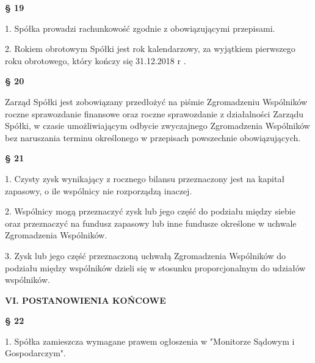 \centerline{\large\textbf{§ 19}}

1. Spółka prowadzi rachunkowość zgodnie z obowiązującymi przepisami.

2. Rokiem obrotowym Spółki jest rok kalendarzowy, za wyjątkiem pierwszego roku obrotowego, który kończy się 31.12.2018 r .\\

\centerline{\large\textbf{§ 20}}

Zarząd Spółki jest zobowiązany przedłożyć na piśmie Zgromadzeniu Wspólników roczne sprawozdanie finansowe oraz roczne sprawozdanie z działalności Zarządu Spółki, w czasie umożliwiającym odbycie zwyczajnego Zgromadzenia Wspólników bez naruszania terminu określonego w przepisach powszechnie obowiązujących.\\

\centerline{\large\textbf{§ 21}}

1. Czysty zysk wynikający z rocznego bilansu przeznaczony jest na kapitał zapasowy, o ile wspólnicy nie rozporządzą inaczej.

2. Wspólnicy mogą przeznaczyć zysk lub jego część do podziału między siebie oraz przeznaczyć na fundusz zapasowy lub inne fundusze określone w uchwale Zgromadzenia Wspólników.

3. Zysk lub jego część przeznaczoną uchwałą Zgromadzenia Wspólników do podziału między wspólników dzieli się w stosunku proporcjonalnym do udziałów wspólników.\\

\centerline{\large\textbf{VI. POSTANOWIENIA KOŃCOWE}}

\centerline{\large\textbf{§ 22}}

1. Spółka zamieszcza wymagane prawem ogłoszenia w "Monitorze Sądowym i Gospodarczym".\\
